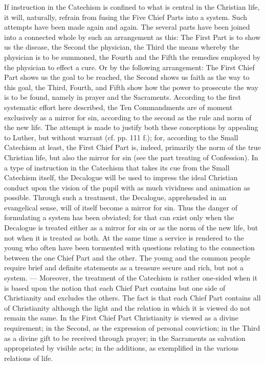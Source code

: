 If instruction in the Catechism is confined to what is central in the Christian life, it will, naturally, refrain from fusing the Five Chief Parts into a system. Such attempts
have been made again and again. The several parts have been joined into a connected whole by such an arrangement as this: The First Part is to show us the disease, the Second the physician, the Third the means whereby the physician is to be summoned, the Fourth and the Fifth the remedies employed by the physician to effect a cure. Or by the following arrangement: The First Chief Part shows us the goal to be reached, the Second shows us faith as the way to this goal, the Third, Fourth, and Fifth show how the power to prosecute the way is to be found, namely in prayer and the Sacraments. According to the first systematic effort here described, the Ten Commandments are of moment exclusively as a mirror for sin, according to the second as the rule and norm of the new life. The attempt is made to justify both these conceptions by appealing to Luther, but without warrant (cf. pp. 111 f.); for, according to the Small Catechism at least, the First Chief Part is, indeed, primarily the norm of the true Christian life, but also the mirror for sin (see the part treating of Confession). In a type of instruction in the Catechism that takes its cue from the Small Catechism itself, the Decalogue will be used to impress the ideal Christian conduct upon the vision of the pupil with as much vividness and animation as possible. Through such a treatment, the Decalogue, apprehended in an evangelical sense, will of itself become a mirror for sin. Thus the danger of formulating a system has been obviated; for that can exist only when the Decalogue is treated either as a mirror for sin or as the norm of the new life, but not when it is treated as both. At the same time a service is rendered to the young who often have been tormented with questions relating to the connection between the one Chief Part and the other. The young and the common people require brief and definite statements as a treasure secure and rich, but not a system. — Moreover, the treatment of the
Catechism is rather one-sided when it is based upon the notion that each Chief Part contains but one side of Christianity and excludes the others. The fact is that each Chief Part contains all of Christianity although the light and the relation in which it is viewed do not remain the same. In the First Chief Part Christianity is viewed as a divine requirement; in the Second, as the expression of personal conviction; in the Third as a divine gift to be received through prayer; in the Sacraments as salvation appropriated by visible acts; in the additions, as exemplified in the various relations of life.


